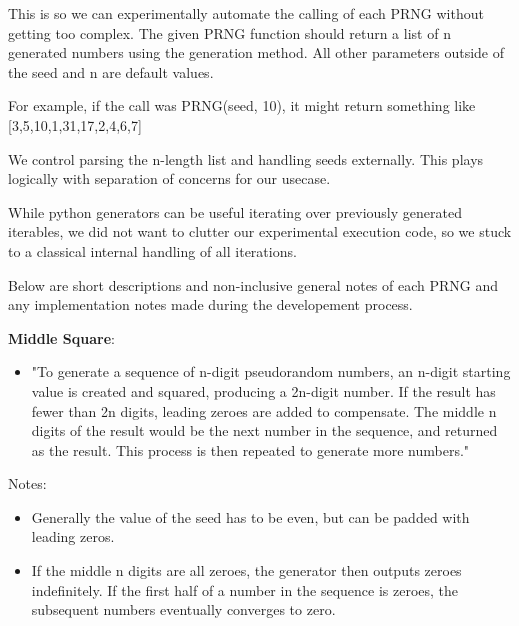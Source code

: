 \documentclass[conference]{IEEEtran}
\begin{document}
This is so we can experimentally automate the calling of each PRNG without getting too complex.
The given PRNG function should return a list of n generated numbers using the generation method.
All other parameters outside of the seed and n are default values.

For example, if the call was PRNG(seed, 10),
it might return something like
[3,5,10,1,31,17,2,4,6,7]

We control parsing the n-length list and handling seeds externally. 
This plays logically with separation of concerns for our usecase.

While python generators can be useful iterating over previously generated iterables,
we did not want to clutter our experimental execution code, so we stuck to a classical
internal handling of all iterations.

Below are short descriptions and non-inclusive general notes of each PRNG and any implementation notes made during the developement process.


\noindent\textbf{Middle Square}:
\begin{itemize}
    \item "To generate a sequence of n-digit pseudorandom numbers, an n-digit starting value is created and squared, producing a 2n-digit number. If the result has fewer than 2n digits, leading zeroes are added to compensate. The middle n digits of the result would be the next number in the sequence, and returned as the result. This process is then repeated to generate more numbers." \cite{MiddleSquare}
\end{itemize}
Notes:
\begin{itemize}
    \item Generally the value of the seed has to be even, but can be padded with leading zeros.
    \item If the middle n digits are all zeroes, the generator then outputs zeroes indefinitely. If the first half of a number in the sequence is zeroes, the subsequent numbers eventually converges to zero.
\end{itemize}
\end{document}
